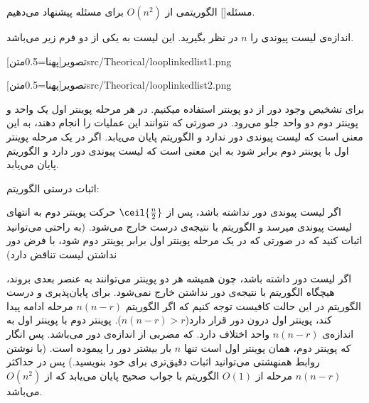
‌مسئله[]
الگوریتمی از
$O(n^2)$ 
برای مسئله پیشنهاد می‌دهیم.

اندازه‌ی لیست پیوندی را $n$ در نظر بگیرید. این لیست به یکی از دو فرم زیر می‌باشد.
\begin{center}
‌تصویر[پهنا=0.5‌متن]{src/Theorical/looplinkedlist1.png}
\end{center}
\begin{center}
‌تصویر[پهنا=0.5‌متن]{src/Theorical/looplinkedlist2.png}
\end{center}

برای تشخیص وجود دور از دو پوینتر استفاده میکنیم.
در هر مرحله پوینتر اول یک واحد و پوینتر دوم دو واحد جلو می‌رود. در صورتی که نتوانند این عملیات را انجام دهند، به این معنی است که لیست پیوندی دور ندارد و الگوریتم پایان می‌یابد. اگر در یک مرحله پوینتر اول با پوینتر دوم برابر شود به این معنی است که لیست پیوندی دور دارد و الگوریتم پایان می‌یابد.

اثبات درستی الگوریتم:

اگر لیست پیوندی دور نداشته باشد، پس از 
$\ceil{\frac{n}{2}}$
حرکت پوینتر دوم به انتهای لیست پیوندی میرسد و الگوریتم با نتیجه‌ی درست خارج می‌شود. (به راحتی می‌توانید اثبات کنید که در صورتی که در یک مرحله پوینتر اول برابر پوینتر دوم شود،‌ با فرض دور نداشتن لیست تناقض دارد)

اگر لیست دور داشته باشد،‌ چون همیشه هر دو پوینتر می‌توانند به عنصر بعدی بروند، هیچگاه الگوریتم با نتیجه‌ی دور نداشتن خارج نمی‌شود.
برای پایان‌پذیری و درست الگوریتم در این حالت کافیست توجه کنیم که اگر الگوریتم
$n(n-r)$
مرحله ادامه پیدا کند، پوینتر اول درون دور قرار دارد($n(n-r) > r$).
پوینتر دوم با پوینتر اول به اندازه‌ی
$n(n-r)$
واحد اختلاف دارد. که مضربی از اندازه‌ی دور می‌باشد. پس انگار که پوینتر دوم، همان پوینتر اول است تنها $n$ بار بیشتر دور را پیموده است. (با نوشتن روابط همنهشتی می‌توانید اثبات دقیق‌تری برای خود بنویسید.)
پس در حداکثر $n(n-r)$ مرحله از $O(1)$ الگوریتم با جواب صحیح پایان می‌یابد که از $O(n^2)$ می‌باشد.






